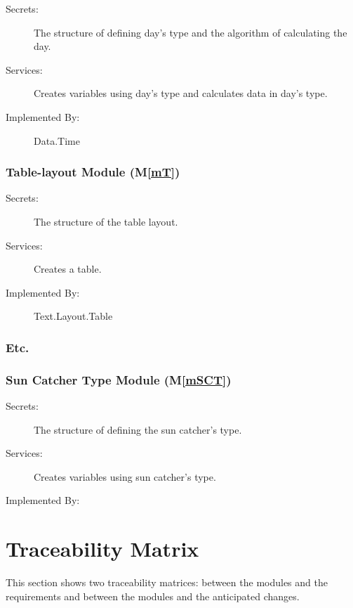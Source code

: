 \documentclass[12pt, titlepage]{article}
\newcommand{\mref}[1]{M\ref{#1}}
\begin{document}
\begin{description}
\item[Secrets:] The structure of defining day's type and the algorithm of calculating the day.
\item[Services:] Creates variables using day's type and calculates data in day's type.
\item[Implemented By:] Data.Time
\end{description}

\subsubsection{Table-layout Module (\mref{mT})}

\begin{description}
\item[Secrets:] The structure  of the table layout.
\item[Services:] Creates  a table.
\item[Implemented By:] Text.Layout.Table
\end{description}
\subsubsection{Etc.}

\subsubsection{Sun Catcher Type Module (\mref{mSCT})}

\begin{description}
\item[Secrets:] The structure of defining the sun catcher's type.
\item[Services:] Creates variables using sun catcher's type.
\item[Implemented By:] \progname
\end{description}



\section{Traceability Matrix} \label{SecTM}

This section shows two traceability matrices: between the modules and the
requirements and between the modules and the anticipated changes.
\end{document}
